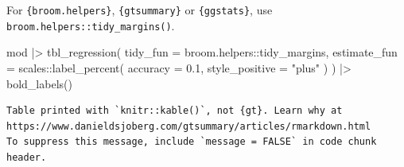 \documentclass[
  letterpaper,
  DIV=11,
  numbers=noendperiod,
  oneside]{scrreprt}
\newenvironment{Shaded}{\begin{snugshade}}{\end{snugshade}}
\newcommand{\AttributeTok}[1]{\textcolor[rgb]{0.40,0.45,0.13}{#1}}
\newcommand{\FloatTok}[1]{\textcolor[rgb]{0.68,0.00,0.00}{#1}}
\newcommand{\FunctionTok}[1]{\textcolor[rgb]{0.28,0.35,0.67}{#1}}
\newcommand{\NormalTok}[1]{\textcolor[rgb]{0.00,0.23,0.31}{#1}}
\newcommand{\SpecialCharTok}[1]{\textcolor[rgb]{0.37,0.37,0.37}{#1}}
\newcommand{\StringTok}[1]{\textcolor[rgb]{0.13,0.47,0.30}{#1}}
\begin{document}
For \texttt{\{broom.helpers\}}, \texttt{\{gtsummary\}} or
\texttt{\{ggstats\}}, use \texttt{broom.helpers::tidy\_margins()}.

\begin{Shaded}
\begin{Highlighting}[]
\NormalTok{mod }\SpecialCharTok{|\textgreater{}} 
  \FunctionTok{tbl\_regression}\NormalTok{(}
    \AttributeTok{tidy\_fun =}\NormalTok{ broom.helpers}\SpecialCharTok{::}\NormalTok{tidy\_margins,}
    \AttributeTok{estimate\_fun =}\NormalTok{ scales}\SpecialCharTok{::}\FunctionTok{label\_percent}\NormalTok{(}
      \AttributeTok{accuracy =} \FloatTok{0.1}\NormalTok{,}
      \AttributeTok{style\_positive =} \StringTok{"plus"}
\NormalTok{    )}
\NormalTok{  ) }\SpecialCharTok{|\textgreater{}} 
  \FunctionTok{bold\_labels}\NormalTok{()}
\end{Highlighting}
\end{Shaded}

\begin{verbatim}
Table printed with `knitr::kable()`, not {gt}. Learn why at
https://www.danieldsjoberg.com/gtsummary/articles/rmarkdown.html
To suppress this message, include `message = FALSE` in code chunk header.
\end{verbatim}
\end{document}
